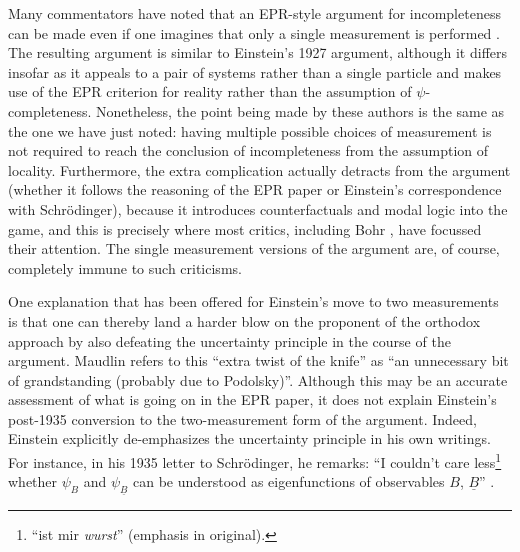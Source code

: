 \documentclass[aps,nofootinbib,12pt]{revtex4}
\begin{document}
Many commentators have noted that an EPR-style argument for
incompleteness can be made even if one imagines that only a single
measurement is performed \cite{Hardy1995,Redhead,Fine,Maudlin}. The
resulting argument is similar to Einstein's 1927 argument, although
it differs insofar as it appeals to a pair of systems rather than a
single particle and makes use of the EPR criterion for reality
rather than the assumption of $\psi$-completeness. Nonetheless, the
point being made by these authors is the same as the one we have
just noted: having multiple possible choices of measurement is not
required to reach the conclusion of incompleteness from the
assumption of locality. Furthermore, the extra complication actually
detracts from the argument (whether it follows the reasoning of the
EPR paper or Einstein's correspondence with Schr\"{o}dinger),
because it introduces counterfactuals and modal logic into the game,
and this is precisely where most critics, including Bohr
\cite{Bohr_replytoEPR}, have focussed their attention. The single
measurement versions of the argument are, of course, completely
immune to such criticisms.

One explanation that has been offered for Einstein's move to two
measurements is that one can thereby land a harder blow on the
proponent of the orthodox approach by also defeating the uncertainty
principle in the course of the argument. Maudlin refers to this
``extra twist of the knife'' as ``an unnecessary bit of
grandstanding (probably due to Podolsky)''\cite{Maudlin}. Although
this may be an accurate assessment of what is going on in the EPR
paper, it does not explain Einstein's post-1935 conversion to the
two-measurement form of the argument. Indeed, Einstein explicitly
de-emphasizes the uncertainty principle in his own writings. For
instance, in his 1935 letter to Schr\"{o}dinger, he remarks: ``I
couldn't care less\footnote{``ist mir \textit{wurst}'' (emphasis in
original).} whether $\psi_{B}$ and $\psi_{\underline{B}}$ can be
understood as eigenfunctions of observables $B$,
$\underline{B}$'' \cite{EtoS1935}.

\end{document}
